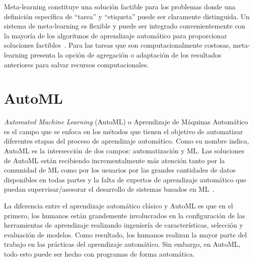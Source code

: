 Meta-learning constituye una solución factible para los problemas donde una definición específica de ``tarea'' y ``etiqueta'' puede ser claramente distinguida. Un sistema de meta-learning es flexible y puede ser integrado convenientemente con la mayoría de los algoritmos de aprendizaje automático para proporcionar soluciones factibles~\cite{peng2020comprehensive}. Para las tareas que son computacionalmente costosas, meta-learning presenta la opción de agregación o adaptación de los resultados anteriores para salvar recursos computacionales.
 
\section{AutoML}\label{sec:automl}




\textit{Automated Machine Learning} (AutoML) o Aprendizaje de Máquinas Automático es el campo que se enfoca en los métodos que tienen el objetivo de automatizar diferentes etapas del proceso de aprendizaje automático. Como su nombre indica, AutoML es la intersección de dos campos: automatización y ML. Las soluciones de AutoML están recibiendo incrementalmente más atención tanto por la comunidad de ML como por los usuarios por las grandes cantidades de datos disponibles en todas partes y la falta de expertos de aprendizaje automático que puedan supervisar/asesorar el desarrollo de sistemas basados en ML~\cite{hutter2019autmlbook}.

La diferencia entre el aprendizaje automático clásico y AutoML es que en el primero, los humanos están grandemente involucrados en la configuración de las herramientas de aprendizaje realizando ingeniería de características, selección y evaluación de modelos. Como resultado, los humanos realizan la mayor parte del trabajo en las prácticas del aprendizaje automático. Sin embargo, en AutoML, todo esto puede ser hecho con programas de forma automática.

